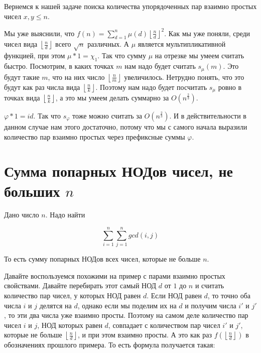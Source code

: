 \begin{example}
    Вернемся к нашей задаче поиска количества упорядоченных пар взаимно простых чисел $x, y \le n$.

    Мы уже выяснили, что $f(n) = \sum \limits_{d = 1}^{n} \mu(d) \left\lfloor \frac{n}{d} \right\rfloor^2$.
    Как мы уже поняли, среди чисел вида $\left\lfloor \frac{n}{d} \right\rfloor$ всего $\sqrt{n}$ различных.
    А $\mu$ является мультипликативной функцией, при этом
    $\mu * 1 = \chi_1$. Так что сумму $\mu$ на отрезке мы умеем считать быстро.
    Посмотрим, в каких точках $m$ нам надо будет считать $s_{\mu}(m)$.
    Это будут такие $m$, что на них число $\left\lfloor \frac{n}{m} \right\rfloor$ увеличилось.
    Нетрудно понять, что это будут как раз числа вида $\left\lfloor \frac{n}{k} \right\rfloor$.
    Поэтому нам надо будет посчитать $s_{\mu}$ ровно в точках вида $\left\lfloor \frac{n}{k} \right\rfloor$,
    а это мы умеем делать суммарно за $O(n^{\frac{2}{3}})$.
\end{example}

\begin{example}
    $\varphi * 1 = id$. Так что $s_{\varphi}$ тоже можно считать за $O(n^{\frac{2}{3}})$. И в действительности в данном случае нам этого достаточно, потому что мы с самого начала выразили количество пар взаимно простых через префиксные суммы $\varphi$.
\end{example}


\section{Сумма попарных НОДов чисел, не больших $n$}


\begin{example}
    Дано число $n$. Надо найти

    $$\sum_{i = 1}^n \sum_{j = 1}^n gcd(i, j)$$

    То есть сумму попарных НОДов всех чисел, которые не больше $n$.
\end{example}

Давайте воспользуемся похожими на пример с парами взаимно простых свойствами. Давайте перебирать этот самый НОД $d$ от $1$ до $n$ и считать количество пар чисел, у которых НОД равен $d$. Если НОД равен $d$, то точно оба числа $i$ и $j$ делятся на $d$, однако если мы поделим их на $d$ и получим числа $i'$ и $j'$, то эти два числа уже взаимно просты. Поэтому на самом деле количество пар чисел $i$ и $j$, НОД которых равен $d$, совпадает с количеством пар чисел $i'$ и $j'$, которые не больше $\left\lfloor \frac{n}{d} \right\rfloor$, и при этом взаимно просты. А это как раз $f(\left\lfloor \frac{n}{d} \right\rfloor)$ в обозначениях прошлого примера. То есть формула получается такая:

